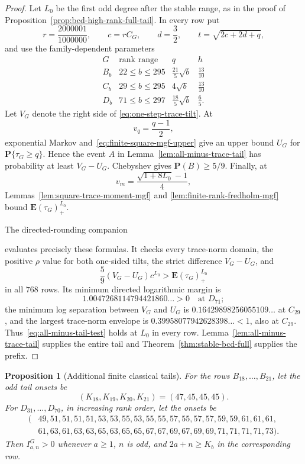 \documentclass[11pt,reqno]{amsart}
\theoremstyle{plain}
\newtheorem{proposition}[theorem]{Proposition}
\theoremstyle{definition}
\begin{document}
\begin{proof}
Let $L_0$ be the first odd degree after the stable range, as in the proof of
Proposition~\ref{prop:bcd-high-rank-full-tail}.  In every row put
\[
 r=\frac{2000001}{1000000},\qquad c=rC_G,
 \qquad d=\frac32,
 \qquad t=\sqrt{2c+2d+q},
\]
and use the family-dependent parameters
\[
\begin{array}{c|c|c|c}
G&\text{rank range}&q&h\\ \hline
B_b&22\leq b\leq295&\frac{21}{5}\sqrt b&\frac{13}{10}\\
C_b&29\leq b\leq295&4\sqrt b&\frac{13}{10}\\
D_b&71\leq b\leq297&\frac{18}{5}\sqrt b&\frac65.
\end{array}
\]
Let $V_G$ denote the right side of
\eqref{eq:one-step-trace-tilt}.  At
\[
 v_q=\frac{q-1}{2},
 \]
exponential Markov and~\eqref{eq:finite-square-mgf-upper} give an upper
bound $U_G$ for $\mathbf P\{\tau_G\geq q\}$.  Hence the event $A$ in
Lemma~\ref{lem:all-minus-trace-tail} has probability at least $V_G-U_G$.
Chebyshev gives $\mathbf P(B)\geq5/9$.  Finally, at
\[
 v_m=\frac{\sqrt{1+8L_0}-1}{4},
\]
Lemmas~\ref{lem:square-trace-moment-mgf} and
\ref{lem:finite-rank-fredholm-mgf} bound
$\mathbf E(\tau_G)_+^{L_0}$.

The directed-rounding companion
\begin{center}
\end{center}
 evaluates precisely these formulas.  It checks every trace-norm domain,
the positive $\rho$ value for both one-sided tilts, the strict difference
$V_G-U_G$, and
\[
 \frac59(V_G-U_G)c^{L_0}>
 \mathbf E(\tau_G)_+^{L_0}
\]
in all $768$ rows.  Its minimum directed logarithmic margin is
\[
 1.0047268114794421860\ldots>0
 \quad\text{at }D_{71};
\]
the minimum log separation between $V_G$ and $U_G$ is
$0.16429898256055109\ldots$ at $C_{29}$, and the largest trace-norm
envelope is $0.39958077942628398\ldots<1$, also at $C_{29}$.
Thus~\eqref{eq:all-minus-tail-test} holds at $L_0$ in every row.
Lemma~\ref{lem:all-minus-trace-tail} supplies the entire tail and
Theorem~\ref{thm:stable-bcd-full} supplies the prefix.
\end{proof}

\begin{proposition}[Additional finite classical tails]
\label{prop:bcd-low-tail}
For the rows $B_{18},\ldots,B_{21}$, let the odd tail onsets be
\[
 (K_{18},K_{19},K_{20},K_{21})=(47,45,45,45).
\]
For $D_{31},\ldots,D_{70}$, in increasing rank order, let the onsets be
\[
\begin{split}
(&49,51,51,51,51,53,53,55,53,55,
55,57,55,57,57,59,59,61,61,61,\\
&61,63,61,63,63,65,63,65,65,67,
67,69,67,69,69,71,71,71,71,73).
\end{split}
\]
Then $I^G_{a,n}>0$ whenever $a\geq1$, $n$ is odd, and
$2a+n\geq K_b$ in the corresponding row.
\end{proposition}
\end{document}
